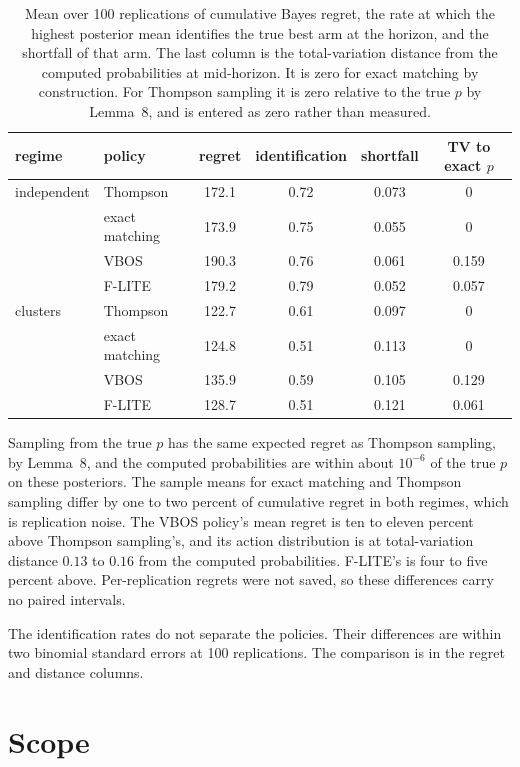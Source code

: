 \documentclass[11pt]{article}
\begin{document}
\begin{table}[h]
\centering
\begin{tabular}{llcccc}
\toprule
regime & policy & regret & identification & shortfall &
TV to exact $p$ \\
\midrule
independent & Thompson & 172.1 & 0.72 & 0.073 & 0 \\
            & exact matching & 173.9 & 0.75 & 0.055 & 0 \\
            & VBOS & 190.3 & 0.76 & 0.061 & 0.159 \\
            & F-LITE & 179.2 & 0.79 & 0.052 & 0.057 \\
\addlinespace
clusters    & Thompson & 122.7 & 0.61 & 0.097 & 0 \\
            & exact matching & 124.8 & 0.51 & 0.113 & 0 \\
            & VBOS & 135.9 & 0.59 & 0.105 & 0.129 \\
            & F-LITE & 128.7 & 0.51 & 0.121 & 0.061 \\
\bottomrule
\end{tabular}
\caption{Mean over 100 replications of cumulative Bayes regret, the
rate at which the highest posterior mean identifies the true best arm
at the horizon, and the shortfall of that arm. The last column is the
total-variation distance from the computed probabilities at mid-horizon. It
is zero for exact matching by construction. For Thompson sampling it
is zero relative to the true $p$ by Lemma~8, and is entered as zero
rather than measured.}
\label{tab:bandit}
\end{table}

Sampling from the true $p$ has the same expected regret as Thompson
sampling, by Lemma~8, and the computed probabilities are within about
$10^{-6}$ of the true $p$ on these posteriors. The sample means for
exact matching and Thompson sampling differ by one to two percent of
cumulative regret in both regimes, which is replication noise. The VBOS policy's mean regret is
ten to eleven percent above Thompson sampling's, and its action
distribution is at total-variation distance $0.13$ to $0.16$ from the computed probabilities. F-LITE's is four to five percent above. Per-replication
regrets were not saved, so these differences carry no paired
intervals.

The identification rates do not separate the policies. Their
differences are within two binomial standard errors at 100
replications. The comparison is in the regret and distance columns.

\section{Scope}
\label{sec:limits}
\end{document}
